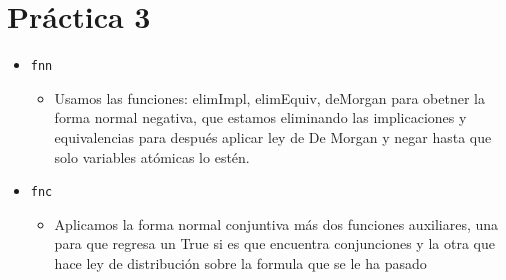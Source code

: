 \documentclass{article}
\newcommand{\code}[1]{\textcolor{white!25!black}{\texttt{#1}}}
\begin{document}
\section*{\LARGE{Práctica 3}}
\newcommand{\localtextbulletone}{\textcolor{black}{\raisebox{.45ex}{\rule{.6ex}{.6ex}}}}
\renewcommand{\labelitemi}{\localtextbulletone}
\begin{itemize}
\item \code{fnn}
  \begin{itemize}
  \item Usamos las funciones: elimImpl, elimEquiv, deMorgan para obetner la forma normal negativa,
    que estamos eliminando las implicaciones y equivalencias para después aplicar ley de De Morgan
    y negar hasta que solo variables atómicas lo estén. 
  \end{itemize}
  
\item \code{fnc}
  \begin{itemize}
  \item Aplicamos la forma normal conjuntiva más dos funciones auxiliares, una para que regresa
    un True si es que encuentra conjunciones y la otra que hace ley de distribución sobre la
    formula que se le ha pasado
  \end{itemize}
  

\end{itemize}
\end{document}
